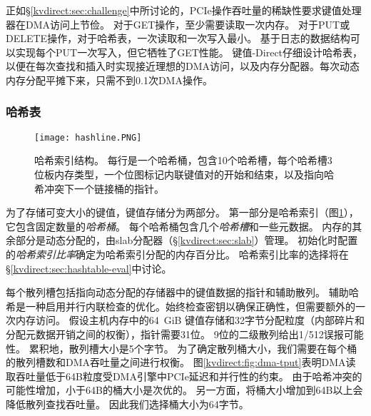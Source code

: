 正如\S \ref {kvdirect:sec:challenge}中所讨论的，PCIe操作吞吐量的稀缺性要求键值处理器在DMA访问上节俭。
对于GET操作，至少需要读取一次内存。
对于PUT或DELETE操作，对于哈希表，一次读取和一次写入最小。
基于日志的数据结构可以实现每个PUT一次写入，但它牺牲了GET性能。
键值-Direct仔细设计哈希表，以便在每次查找和插入时实现接近理想的DMA访问，以及内存分配器。每次动态内存分配平摊下来，只需不到0.1次DMA操作。

\subsubsection{哈希表}
\label{kvdirect:sec:hashtable}

\begin{figure}[t]
\centering
\texttt{[image: hashline.PNG]}
\caption{哈希索引结构。 每行是一个哈希桶，包含10个哈希槽，每个哈希槽3位板内存类型，一个位图标记内联键值对的开始和结束，以及指向哈希冲突下一个链接桶的指针。}
\label{kvdirect:fig:hashtable}

\end{figure}

为了存储可变大小的键值，键值存储分为两部分。 第一部分是哈希索引（图\ref {kvdirect:fig:hashtable}），它包含固定数量的\textit {哈希桶}。 每个哈希桶包含几个\textit {哈希槽}和一些元数据。 内存的其余部分是动态分配的，由slab分配器（\S \ref {kvdirect:sec:slab}）管理。
初始化时配置的\textit {哈希索引比率}确定为哈希索引分配的内存百分比。
哈希索引比率的选择将在\S \ref {kvdirect:sec:hashtable-eval}中讨论。


每个散列槽包括指向动态分配的存储器中的键值数据的指针和辅助散列。
辅助哈希是一种启用并行内联检查的优化。始终检查密钥以确保正确性，但需要额外的一次内存访问。
假设主机内存中的64~GiB 键值存储和32字节分配粒度（内部碎片和分配元数据开销之间的权衡），指针需要31位。
9位的二级散列给出1/512误报可能性。
累积地，散列槽大小是5个字节。
为了确定散列桶大小，我们需要在每个桶的散列槽数和DMA吞吐量之间进行权衡。
图\ref {kvdirect:fig:dma-tput}表明DMA读取吞吐量低于64B粒度受DMA引擎中PCIe延迟和并行性的约束。
由于哈希冲突的可能性增加，小于64B的桶大小是次优的。
另一方面，将桶大小增加到64B以上会降低散列查找吞吐量。
因此我们选择桶大小为64字节。

